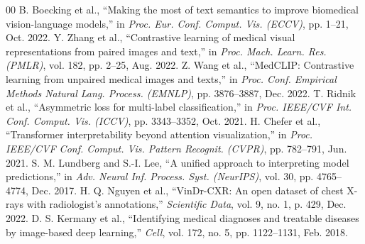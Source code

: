 \documentclass[conference]{IEEEtran}
\begin{document}
\begin{thebibliography}{00}
 B. Boecking et al., ``Making the most of text semantics to improve biomedical vision-language models,'' in \textit{Proc. Eur. Conf. Comput. Vis. (ECCV)}, pp. 1--21, Oct. 2022.
 Y. Zhang et al., ``Contrastive learning of medical visual representations from paired images and text,'' in \textit{Proc. Mach. Learn. Res. (PMLR)}, vol. 182, pp. 2--25, Aug. 2022.
 Z. Wang et al., ``MedCLIP: Contrastive learning from unpaired medical images and texts,'' in \textit{Proc. Conf. Empirical Methods Natural Lang. Process. (EMNLP)}, pp. 3876--3887, Dec. 2022.
 T. Ridnik et al., ``Asymmetric loss for multi-label classification,'' in \textit{Proc. IEEE/CVF Int. Conf. Comput. Vis. (ICCV)}, pp. 3343--3352, Oct. 2021.
 H. Chefer et al., ``Transformer interpretability beyond attention visualization,'' in \textit{Proc. IEEE/CVF Conf. Comput. Vis. Pattern Recognit. (CVPR)}, pp. 782--791, Jun. 2021.
 S. M. Lundberg and S.-I. Lee, ``A unified approach to interpreting model predictions,'' in \textit{Adv. Neural Inf. Process. Syst. (NeurIPS)}, vol. 30, pp. 4765--4774, Dec. 2017.
 H. Q. Nguyen et al., ``VinDr-CXR: An open dataset of chest X-rays with radiologist's annotations,'' \textit{Scientific Data}, vol. 9, no. 1, p. 429, Dec. 2022.
 D. S. Kermany et al., ``Identifying medical diagnoses and treatable diseases by image-based deep learning,'' \textit{Cell}, vol. 172, no. 5, pp. 1122--1131, Feb. 2018.
\end{thebibliography}
\end{document}
